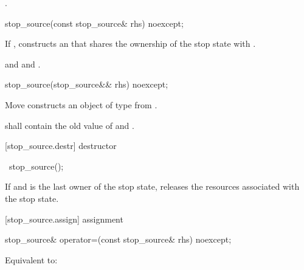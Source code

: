 {\begin{itemdescr}
  \pnum\postconditions {}.
\end{itemdescr}


%
\begin{itemdecl}
stop_source(const stop_source& rhs) noexcept;
\end{itemdecl}
\begin{itemdescr}
  \pnum\effects If ,
                constructs an 
                that shares the ownership of the stop state with .

  \pnum\postconditions {}
                and 
                and .
\end{itemdescr}

%
\begin{itemdecl}
stop_source(stop_source&& rhs) noexcept;
\end{itemdecl}
\begin{itemdescr}
  \pnum\effects Move constructs an object of type  from .

  \pnum\postconditions {} shall contain the old value of  and
                        .
\end{itemdescr}

[stop_source.destr]{ destructor}

%
\begin{itemdecl}
~stop_source();
\end{itemdecl}

\begin{itemdescr}
 \pnum\effects If  and  is the last owner of the stop state,
                releases the resources associated with the stop state.
\end{itemdescr}

[stop_source.assign]{ assignment}

%
\begin{itemdecl}
stop_source& operator=(const stop_source& rhs) noexcept;
\end{itemdecl}
\begin{itemdescr}
  \pnum\effects Equivalent to: 


\end{itemdescr}}
